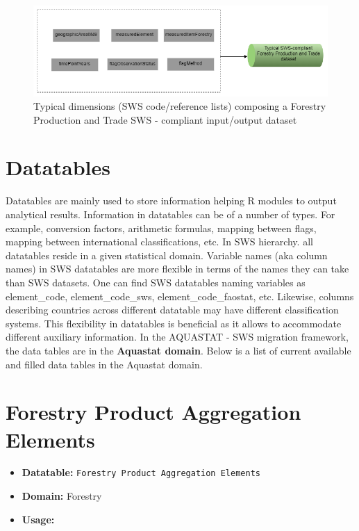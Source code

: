 \documentclass[
]{book}
\providecommand{\tightlist}{%
  \setlength{\itemsep}{0pt}\setlength{\parskip}{0pt}}
\begin{document}
\begin{figure}

{\centering \includegraphics[width=0.65\linewidth]{images/typical_dataset_forestry} 

}

\caption{Typical dimensions (SWS code/reference lists) composing a Forestry Production and Trade SWS - compliant input/output dataset}\label{fig:fig4}
\end{figure}

\hypertarget{datatables}{%
\section{Datatables}\label{datatables}}

Datatables are mainly used to store information helping R modules to output analytical results. Information in datatables can be of a number of types. For example, conversion factors, arithmetic formulas, mapping between flags, mapping between international classifications, etc. In SWS hierarchy. all datatables reside in a given statistical domain.
Variable names (aka column names) in SWS datatables are more flexible in terms of the names they can take than SWS datasets. One can find SWS datatables naming variables as element\_code, element\_code\_sws, element\_code\_faostat, etc. Likewise, columns describing countries across different datatable may have different classification systems. This flexibility in datatables is beneficial as it allows to accommodate different auxiliary information.
In the AQUASTAT - SWS migration framework, the data tables are in the \textbf{Aquastat domain}. Below is a list of current available and filled data tables in the Aquastat domain.

\hypertarget{forestry-product-aggregation-elements}{%
\section*{Forestry Product Aggregation Elements}\label{forestry-product-aggregation-elements}}

\begin{itemize}
\tightlist
\item
  \textbf{Datatable:} \texttt{Forestry\ Product\ Aggregation\ Elements}
\item
  \textbf{Domain:} Forestry
\item
  \textbf{Usage:}
\end{itemize}
\end{document}
